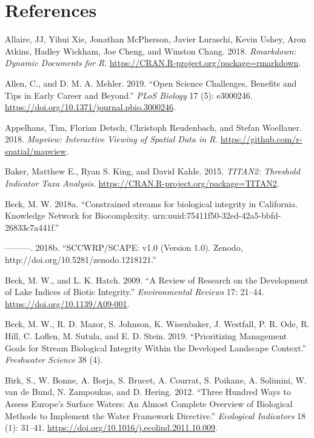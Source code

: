 \documentclass[fleqn,10pt,lineno]{wlpeerj} %
\begin{document}
\hypertarget{references}{%
\section*{References}\label{references}}

\hypertarget{refs}{}
\leavevmode\hypertarget{ref-Allaire18}{}%
Allaire, JJ, Yihui Xie, Jonathan McPherson, Javier Luraschi, Kevin Ushey, Aron Atkins, Hadley Wickham, Joe Cheng, and Winston Chang. 2018. \emph{Rmarkdown: Dynamic Documents for R}. \url{https://CRAN.R-project.org/package=rmarkdown}.

\leavevmode\hypertarget{ref-Allen19}{}%
Allen, C., and D. M. A. Mehler. 2019. ``Open Science Challenges, Benefits and Tips in Early Career and Beyond.'' \emph{PLoS Biology} 17 (5): e3000246. \url{https://doi.org/10.1371/journal.pbio.3000246}.

\leavevmode\hypertarget{ref-Appelhans18}{}%
Appelhans, Tim, Florian Detsch, Christoph Reudenbach, and Stefan Woellauer. 2018. \emph{Mapview: Interactive Viewing of Spatial Data in R}. \url{https://github.com/r-spatial/mapview}.

\leavevmode\hypertarget{ref-Baker15}{}%
Baker, Matthew E., Ryan S. King, and David Kahle. 2015. \emph{TITAN2: Threshold Indicator Taxa Analysis}. \url{https://CRAN.R-project.org/package=TITAN2}.

\leavevmode\hypertarget{ref-Beck18d}{}%
Beck, M. W. 2018a. ``Constrained streams for biological integrity in California. Knowledge Network for Biocomplexity. urn:uuid:75411f50-32ed-42a5-bbfd-26833c7a441f.''

\leavevmode\hypertarget{ref-Beck18c}{}%
---------. 2018b. ``SCCWRP/SCAPE: v1.0 (Version 1.0). Zenodo, http://doi.org/10.5281/zenodo.1218121.''

\leavevmode\hypertarget{ref-Beck09}{}%
Beck, M. W., and L. K. Hatch. 2009. ``A Review of Research on the Development of Lake Indices of Biotic Integrity.'' \emph{Environmental Reviews} 17: 21--44. \url{https://doi.org/10.1139/A09-001}.

\leavevmode\hypertarget{ref-Beck19b}{}%
Beck, M. W., R. D. Mazor, S. Johnson, K. Wisenbaker, J. Westfall, P. R. Ode, R. Hill, C. Loflen, M. Sutula, and E. D. Stein. 2019. ``Prioritizing Management Goals for Stream Biological Integrity Within the Developed Landscape Context.'' \emph{Freshwater Science} 38 (4).

\leavevmode\hypertarget{ref-Birk12}{}%
Birk, S., W. Bonne, A. Borja, S. Brucet, A. Courrat, S. Poikane, A. Solimini, W. van de Bund, N. Zampoukas, and D. Hering. 2012. ``Three Hundred Ways to Assess Europe's Surface Waters: An Almost Complete Overview of Biological Methods to Implement the Water Framework Directive.'' \emph{Ecological Indicators} 18 (1): 31--41. \url{https://doi.org/10.1016/j.ecolind.2011.10.009}.
\end{document}
